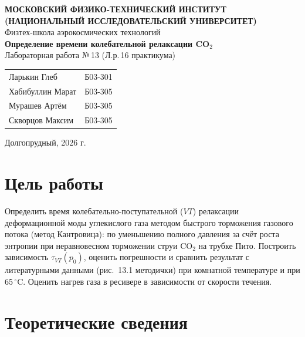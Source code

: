 \documentclass[12pt,a4paper]{article}
\newcommand{\COO}{\mathrm{CO_2}}
\begin{document}
\begin{titlepage}
    \begin{center}
        \textbf{МОСКОВСКИЙ ФИЗИКО-ТЕХНИЧЕСКИЙ ИНСТИТУТ} \\
        \textbf{(НАЦИОНАЛЬНЫЙ ИССЛЕДОВАТЕЛЬСКИЙ УНИВЕРСИТЕТ)}
        \\[1cm]
        {\large Физтех-школа аэрокосмических технологий}
        \\[3.5cm]
        {\Huge \textbf{Определение времени колебательной релаксации CO$_2$}}
        \\[0.5cm]
        {\large Лабораторная работа №\,13 (Л.р.\,16 практикума)}
        \\[1.5cm]
        \begin{flushright}
            \begin{tabular}{l l}
                Ларькин Глеб & Б03-301 \\
                Хабибуллин Марат & Б03-305 \\
                Мурашев Артём & Б03-305 \\
                Скворцов Максим & Б03-305 \\
            \end{tabular}
        \end{flushright}
        \vfill
        {\large Долгопрудный, 2026 г.}
    \end{center}
\end{titlepage}

\tableofcontents
\newpage

\section{Цель работы}

Определить время колебательно-поступательной ($VT$) релаксации
деформационной моды углекислого газа методом быстрого торможения
газового потока (метод Кантровица): по уменьшению полного давления
за счёт роста энтропии при неравновесном торможении струи $\COO$ на
трубке Пито. Построить зависимость $\tau_{VT}(p_0)$, оценить
погрешности и сравнить результат с литературными данными
(рис.~13.1 методички) при комнатной температуре и при 65\,$^\circ$C.
Оценить нагрев газа в ресивере в зависимости от скорости течения.

\section{Теоретические сведения}
\end{document}

